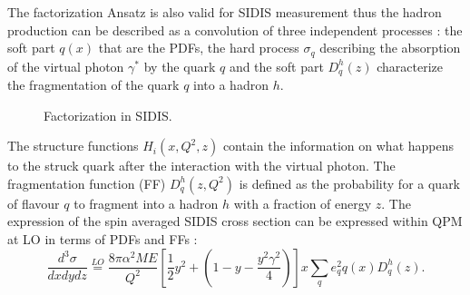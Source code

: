 The factorization Ansatz is also valid for SIDIS measurement thus the hadron production can be described as a convolution of three independent processes : the soft part $q(x)$ that are the PDFs, the hard process $\sigma_q$ describing the absorption of the virtual photon $\gamma^*$ by the quark $q$ and the soft part $D_q^h(z)$ characterize the fragmentation of the quark $q$ into a hadron $h$.

\begin{figure}[!h]
  \centering
	\caption{Factorization in SIDIS.}
	\label{pic:SIDIS}
\end{figure}

The structure functions $H_i(x,Q^2,z)$ contain the information on what happens to the struck quark after the interaction with the virtual photon. The fragmentation function (FF) $D_q^h(z,Q^2)$ is defined as the probability for a quark of flavour $q$ to fragment into a hadron $h$ with a fraction of energy $z$. The expression of the spin averaged SIDIS cross section can be expressed within QPM at LO in terms of PDFs and FFs \cite{BERGER,Panknin} :
%
\begin{equation}
  \frac{d^3 \sigma}{dxdydz} \stackrel{LO}{=} \frac{8\pi\alpha^2ME}{Q^2}\left[\frac{1}{2}y^2+\left(1-y-\frac{y^2 \gamma^2}{4}\right)\right]x\sum\limits_qe^2_qq(x)D_q^h(z).
  \label{eq:unpolSIDIS}
\end{equation}

